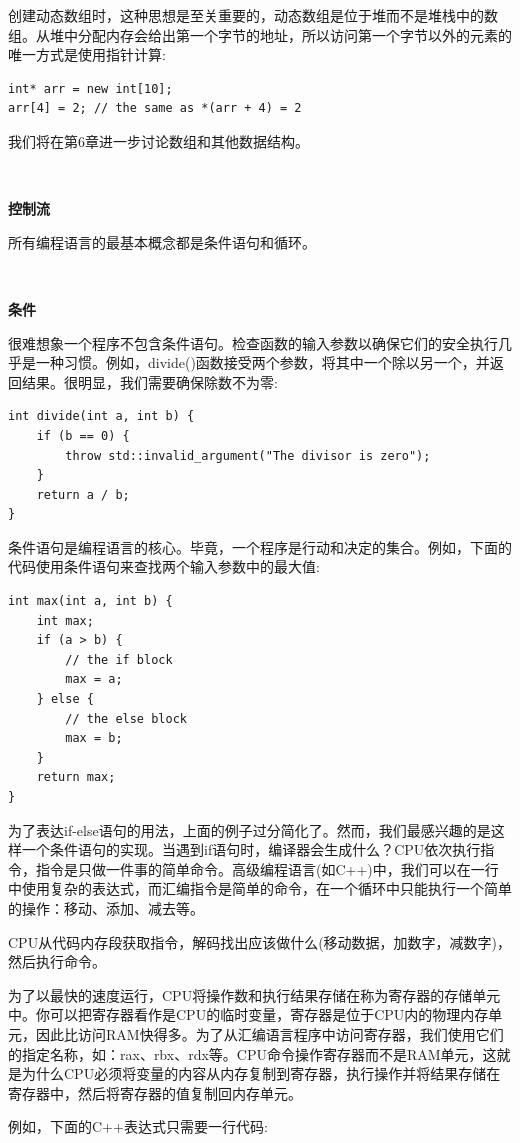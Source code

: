 创建动态数组时，这种思想是至关重要的，动态数组是位于堆而不是堆栈中的数组。从堆中分配内存会给出第一个字节的地址，所以访问第一个字节以外的元素的唯一方式是使用指针计算: \par

\begin{lstlisting}[caption={}]
int* arr = new int[10];
arr[4] = 2; // the same as *(arr + 4) = 2
\end{lstlisting}

我们将在第6章进一步讨论数组和其他数据结构。 \par

\noindent\textbf{}\ \par
\textbf{控制流} \ \par
所有编程语言的最基本概念都是条件语句和循环。\par

\noindent\textbf{}\ \par
\textbf{条件} \ \par
很难想象一个程序不包含条件语句。检查函数的输入参数以确保它们的安全执行几乎是一种习惯。例如，divide()函数接受两个参数，将其中一个除以另一个，并返回结果。很明显，我们需要确保除数不为零: \par

\begin{lstlisting}[caption={}]
int divide(int a, int b) {
	if (b == 0) {
		throw std::invalid_argument("The divisor is zero");
	}
	return a / b;
}
\end{lstlisting}

条件语句是编程语言的核心。毕竟，一个程序是行动和决定的集合。例如，下面的代码使用条件语句来查找两个输入参数中的最大值: \par

\begin{lstlisting}[caption={}]
int max(int a, int b) {
	int max;
	if (a > b) {
		// the if block
		max = a;
	} else {
		// the else block
		max = b;
	}
	return max;
}
\end{lstlisting}

为了表达if-else语句的用法，上面的例子过分简化了。然而，我们最感兴趣的是这样一个条件语句的实现。当遇到if语句时，编译器会生成什么？CPU依次执行指令，指令是只做一件事的简单命令。高级编程语言(如C++)中，我们可以在一行中使用复杂的表达式，而汇编指令是简单的命令，在一个循环中只能执行一个简单的操作：移动、添加、减去等。 \par
CPU从代码内存段获取指令，解码找出应该做什么(移动数据，加数字，减数字)，然后执行命令。 \par
为了以最快的速度运行，CPU将操作数和执行结果存储在称为寄存器的存储单元中。你可以把寄存器看作是CPU的临时变量，寄存器是位于CPU内的物理内存单元，因此比访问RAM快得多。为了从汇编语言程序中访问寄存器，我们使用它们的指定名称，如：rax、rbx、rdx等。CPU命令操作寄存器而不是RAM单元，这就是为什么CPU必须将变量的内容从内存复制到寄存器，执行操作并将结果存储在寄存器中，然后将寄存器的值复制回内存单元。 \par
例如，下面的C++表达式只需要一行代码: \par

